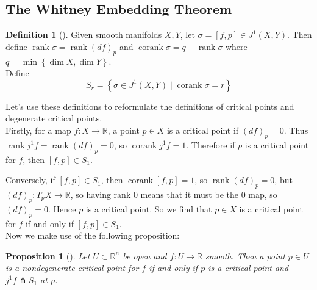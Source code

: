 \documentclass[reqno]{amsart}
\newtheorem{proposition}[theorem]{Proposition}
\theoremstyle{definition}
\newtheorem{definition}[theorem]{Definition}
\theoremstyle{remark}
\DeclareMathOperator{\corank}{corank}
\DeclareMathOperator{\rank}{rank}
\begin{document}
\subsection{The Whitney Embedding Theorem}

\begin{definition}[]
    Given smooth manifolds $X,Y$, let
    $\sigma = \left[ f,p \right] 
    \in J^{1}(X,Y)$. Then define
    $\rank \sigma = \rank \left( df \right)_p$ and
    $\corank \sigma = q - \rank \sigma$ where
    $q = \min \left\{ \dim X, \dim Y \right\} $.\\
    Define
    \[
    S_r = \left\{ \sigma \in J^{1}(X,Y)  \mid 
    \corank \sigma = r \right\} 
    \] 
\end{definition}

Let's use these definitions to
reformulate the definitions of critical points and
degenerate critical points.\\

Firstly, for a map $f \colon X \to \mathbb{R}$, a
point $p \in X$ is a critical point if
$(df)_p = 0$. Thus
$\rank j^{1} f = \rank (df)_p = 0$, so
$\corank j^{1}f = 1$. Therefore
 if $p$ is a critical point for  $f$, then
 $\left[ f,p \right] \in S_1$.

 Conversely, if
 $\left[ f,p \right] \in S_1$, then
 $\corank \left[ f,p \right] = 1$, so
 $\rank \left( df \right)_p = 0$, but
 $\left( df \right)_p \colon T_p X \to \mathbb{R}$, so
 having rank $0$ means that it must be the $0$ map, so
 $(df)_p = 0$. Hence $p$ is a critical point. So we find that
 $p \in X$ is a critical point for $f$ if and only if
 $\left[ f,p \right] \in S_1$.\\
 \linebreak
 Now we make use of the following proposition:
 \begin{proposition}[]\label{Nondegenerate-Equiv-Jets}
     Let $U \subset \mathbb{R}^{n}$ be open
     and $f \colon U \to \mathbb{R}$ smooth. Then
     a point $p \in U$ is a nondegenerate critical point
     for $f$ if and only if 
     $p$ is a critical point and
     $j^{1}f \pitchfork S_1$ at $p$.
 \end{proposition}
\end{document}
